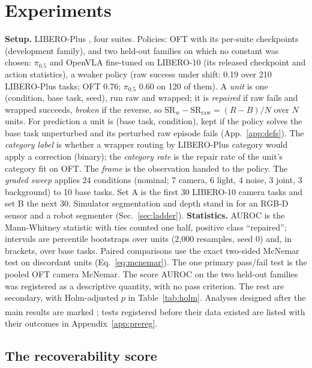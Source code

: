 \documentclass{article}
\newcommand{\pihalf}{$\pi_{0.5}$}
\newcommand{\ph}{\textsuperscript{\dag}}
\begin{document}
\section{Experiments}
\textbf{Setup.} LIBERO-Plus \citep{liberoplus}, four suites. Policies: OFT \citep{oft} with its per-suite checkpoints
(development family), and two held-out families on which no constant was chosen: \pihalf{} \citep{pi05} and OpenVLA
\citep{openvla} fine-tuned on LIBERO-10 (its released checkpoint and action statistics), a weaker policy (raw success
under shift: 0.19 over 210 LIBERO-Plus tasks; OFT 0.76; \pihalf{} 0.60 on 120 of them). A \emph{unit} is one
(condition, base task, seed), run raw and wrapped; it is \emph{repaired} if raw fails and wrapped succeeds,
\emph{broken} if the reverse, so $\mathrm{SR}_w - \mathrm{SR}_{\mathrm{raw}} = (R - B)/N$ over $N$ units. For prediction
a unit is (base task, condition), kept if the policy solves the base task unperturbed and its perturbed raw episode
fails (App.~\ref{app:defs}). The \emph{category label} is whether a wrapper routing by LIBERO-Plus category would apply
a correction (binary); the \emph{category rate} is the repair rate of the unit's category fit on OFT. The \emph{frame}
is the observation handed to the policy. The \emph{graded sweep} applies 24 conditions (nominal; 7 camera, 6 light, 4
noise, 3 joint, 3 background) to 10 base tasks. Set A is the first 30 LIBERO-10 camera tasks and set B the next 30.
Simulator segmentation and depth stand in for an RGB-D sensor and a robot segmenter (Sec.~\ref{sec:ladder}).
\textbf{Statistics.} AUROC is the Mann-Whitney statistic with ties counted one half, positive class ``repaired'';
intervals are percentile bootstraps over units (2{,}000 resamples, seed 0) and, in brackets, over base tasks. Paired
comparisons use the exact two-sided McNemar test on discordant units (Eq.~\ref{eq:mcnemar}). The one primary
pass/fail test is the pooled OFT camera McNemar. The score AUROC on the two held-out families was registered as a
descriptive quantity, with no pass criterion. The rest are secondary, with Holm-adjusted $p$ in Table~\ref{tab:holm}. Analyses designed after the main results are marked \ph; tests registered
before their data existed are listed with their outcomes in Appendix~\ref{app:prereg}.

\subsection{The recoverability score}
\label{sec:score}
\end{document}
